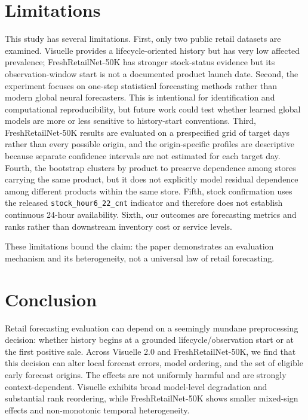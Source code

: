 \section{Limitations}

This study has several limitations. First, only two public retail datasets are examined. Visuelle provides a lifecycle-oriented history but has very low affected prevalence; FreshRetailNet-50K has stronger stock-status evidence but its observation-window start is not a documented product launch date. Second, the experiment focuses on one-step statistical forecasting methods rather than modern global neural forecasters. This is intentional for identification and computational reproducibility, but future work could test whether learned global models are more or less sensitive to history-start conventions. Third, FreshRetailNet-50K results are evaluated on a prespecified grid of target days rather than every possible origin, and the origin-specific profiles are descriptive because separate confidence intervals are not estimated for each target day. Fourth, the bootstrap clusters by product to preserve dependence among stores carrying the same product, but it does not explicitly model residual dependence among different products within the same store. Fifth, stock confirmation uses the released \texttt{stock\_hour6\_22\_cnt} indicator and therefore does not establish continuous 24-hour availability. Sixth, our outcomes are forecasting metrics and ranks rather than downstream inventory cost or service levels.

These limitations bound the claim: the paper demonstrates an evaluation mechanism and its heterogeneity, not a universal law of retail forecasting.

\section{Conclusion}

Retail forecasting evaluation can depend on a seemingly mundane preprocessing decision: whether history begins at a grounded lifecycle/observation start or at the first positive sale. Across Visuelle 2.0 and FreshRetailNet-50K, we find that this decision can alter local forecast errors, model ordering, and the set of eligible early forecast origins. The effects are not uniformly harmful and are strongly context-dependent. Visuelle exhibits broad model-level degradation and substantial rank reordering, while FreshRetailNet-50K shows smaller mixed-sign effects and non-monotonic temporal heterogeneity.

